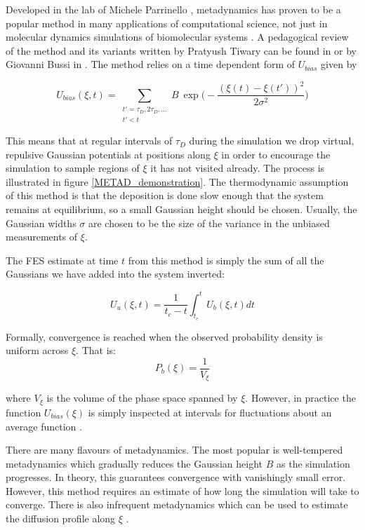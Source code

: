 Developed in the lab of Michele Parrinello \cite{laio2002}, metadynamics has proven to be a popular method in many applications of computational science, not just in molecular dynamics simulations of biomolecular systems \cite{cheng2017, giberti2015, bussi2020a}. A pedagogical review of the method and its variants written by Pratyush Tiwary can be found in \cite{bussi2020} or by Giovanni Bussi in \cite{bussi2015}. The method relies on a time dependent form of $U_{bias}$ given by 

\begin{equation}
	U_{bias} (\xi,t) = \sum\limits_{\substack{t' = \tau_D, 2 \tau_D,... \\ t' < t}}  B \ \exp\bigg( - \frac{(\xi(t) - \xi(t') )^2}{2\sigma^2 }\bigg)
\end{equation}

This means that at regular intervals of $\tau_D$ during the simulation we drop virtual, repulsive Gaussian potentials at positions along $\xi$ in order to encourage the simulation to sample regions of $\xi$ it has not visited already. The process is illustrated in figure \ref{METAD_demonstration}. The thermodynamic assumption of this method is that the deposition is done slow enough that the system remains at equilibrium, so a small Gaussian height should be chosen. Usually, the Gaussian widths $\sigma$ are chosen to be the size of the variance in the unbiased measurements of $\xi$. 

The FES estimate at time $t$ from this method is simply the sum of all the Gaussians we have added into the system inverted:  

\begin{equation}
	U_u (\xi,t)  =  \frac{1}{t_c-t} \int_{t_c}^t U_b(\xi,t) dt
\end{equation}

Formally, convergence is reached when the observed probability density is uniform across $\xi$. That is:
\begin{equation}
	P_b (\xi)= \frac{1}{V_\xi } 
	\label{convergence_criterion_metad}
\end{equation}

where $V_\xi$ is the volume of the phase space spanned by $\xi$. However, in practice the function $U_{bias}(\xi)$ is simply inspected at intervals for fluctuations about an average function \cite{sun2016}. 

There are many flavours of metadynamics. The most popular is well-tempered metadynamics which gradually reduces the Gaussian height $B$ as the simulation progresses\cite{barducci2008}. In theory, this guarantees convergence with vanishingly small error. However, this method requires an estimate of how long the simulation will take to converge. There is also infrequent metadynamics which can be used to estimate the diffusion profile along $\xi$ \cite{tiwary2013, tiwary2016, salvalaglio2014, henin2022}.  

